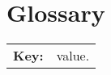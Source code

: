 \section*{Glossary}

\begin{table}[h!]
    \centering
    \begin{tabular}{rl}
        \textbf{Key:}  & value.                       \\
    \end{tabular}
\end{table}